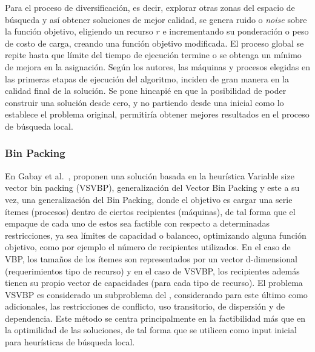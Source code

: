 \documentclass[../informe2.tex]{subfiles}
\begin{document}
Para el proceso de diversificación, es decir, explorar otras zonas del espacio de búsqueda y así obtener soluciones de mejor calidad, se genera ruido o \textit{noise} sobre la función objetivo, eligiendo un recurso $r$ e incrementando su ponderación o peso de costo de carga, creando una función objetivo modificada. El proceso global se repite hasta que límite del tiempo de ejecución termine o se obtenga un mínimo de mejora en la asignación. Según los autores, las máquinas y procesos elegidas en las primeras etapas de ejecución del algoritmo, inciden de gran manera en la calidad final de la solución. Se pone hincapié en que la posibilidad de poder construir una solución desde cero, y no partiendo desde una inicial como lo establece el problema original, permitiría obtener mejores resultados en el proceso de búsqueda local.

\subsubsection{Bin Packing}
En Gabay et al.~\cite{gabay2013variable}, proponen una solución basada en la heurística Variable size vector bin packing (VSVBP), generalización del Vector Bin Packing y este a su vez, una generalización del Bin Packing, donde el objetivo es cargar una serie ítemes (procesos) dentro de ciertos recipientes (máquinas), de tal forma que el empaque de cada uno de estos sea factible con respecto a determinadas restricciones, ya sea límites de capacidad o balanceo, optimizando alguna función objetivo, como por ejemplo el número de recipientes utilizados. En el caso de VBP, los tamaños de los ítemes son representados por un vector d-dimensional (requerimientos tipo de recurso) y en el caso de VSVBP, los recipientes además tienen su propio vector de capacidades (para cada tipo de recurso). El problema VSVBP es considerado un subproblema del \mrp, considerando para este último como adicionales, las restricciones de conflicto, uso transitorio, de dispersión y de dependencia. Este método se centra principalmente en la factibilidad más que en la optimilidad de las soluciones, de tal forma que se utilicen como input inicial para heurísticas de búsqueda local.
\end{document}
